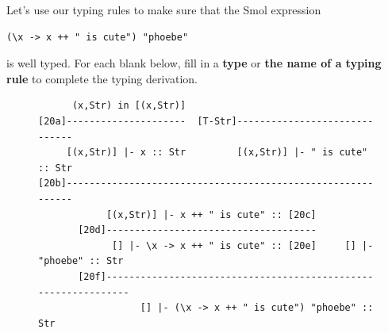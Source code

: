 \documentclass[addpoints]{exam}
\begin{document}
\begin{questions}
\newpage

Let's use our typing rules to make sure that the Smol expression

\begin{verbatim}
(\x -> x ++ " is cute") "phoebe"
\end{verbatim}

is well typed.  For each blank below, fill in a \textbf{type} or \textbf{the name of a typing rule} to complete the typing derivation.

\begin{figure}[h]
\advance\leftskip-20cm
{\small
\begin{verbatim}
      (x,Str) in [(x,Str)]                               
[20a]---------------------  [T-Str]------------------------------
     [(x,Str)] |- x :: Str         [(x,Str)] |- " is cute" :: Str
[20b]------------------------------------------------------------
            [(x,Str)] |- x ++ " is cute" :: [20c]  
       [20d]-------------------------------------
             [] |- \x -> x ++ " is cute" :: [20e]     [] |- "phoebe" :: Str
       [20f]---------------------------------------------------------------
                  [] |- (\x -> x ++ " is cute") "phoebe" :: Str
\end{verbatim}
}
\end{figure}

\end{questions}
\end{document}
